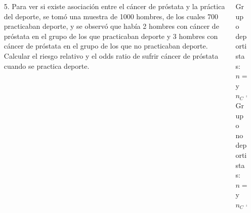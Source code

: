 \documentclass[aspectratio=169,10pt,t]{beamer}
\begin{document}
\begin{frame}
\begin{columns}
\begin{column}[T]{0.7\textwidth}
\begin{enumerate}
\item[5.] Para ver si existe asociación entre el cáncer de próstata y la práctica del deporte, se tomó una muestra de 1000 hombres, de los cuales 700 practicaban deporte, y se observó que había 2 hombres con cáncer de próstata en el grupo de los que practicaban deporte y 3 hombres con cáncer de próstata en el grupo de los que no practicaban deporte. Calcular el riesgo relativo y el odds ratio de sufrir cáncer de próstata cuando se practica deporte.
\end{enumerate}
\end{column}
\begin{column}[T]{0.3\textwidth}
\begin{datos}
Grupo deportistas:\\
$n=700$ y $n_C=2$\\
Grupo no deportistas:\\
$n=300$ y $n_C=3$\\
\end{datos}
\end{column}
\end{columns}
\end{frame}
\end{document}
